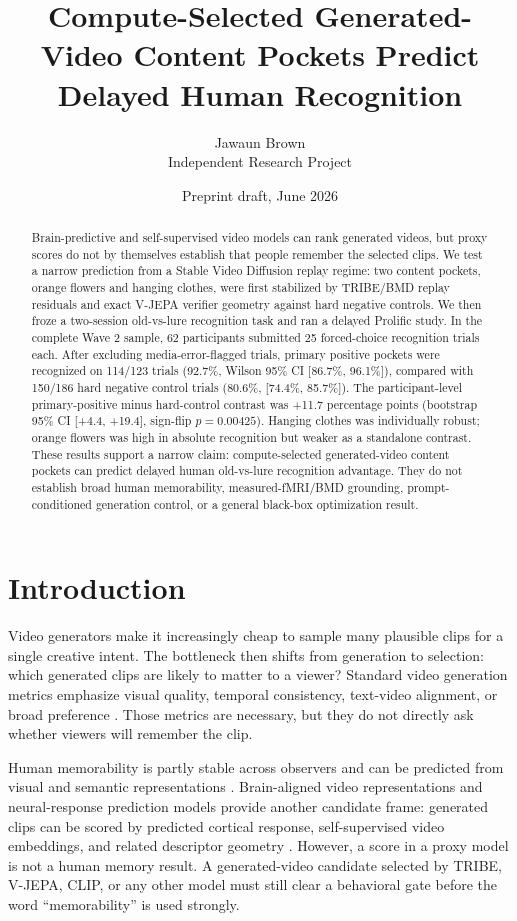 \documentclass[11pt]{article}
\title{Compute-Selected Generated-Video Content Pockets Predict Delayed Human Recognition}
\author{
  Jawaun Brown\\
  Independent Research Project
}
\date{Preprint draft, June 2026}
\begin{document}
\maketitle

\begin{abstract}
Brain-predictive and self-supervised video models can rank generated videos, but
proxy scores do not by themselves establish that people remember the selected
clips. We test a narrow prediction from a Stable Video Diffusion replay regime:
two content pockets, orange flowers and hanging clothes, were first stabilized
by TRIBE/BMD replay residuals and exact V-JEPA verifier geometry against hard
negative controls. We then froze a two-session old-vs-lure recognition task and
ran a delayed Prolific study. In the complete Wave 2 sample, 62 participants
submitted 25 forced-choice recognition trials each. After excluding
media-error-flagged trials, primary positive pockets were recognized on 114/123
trials (92.7\%, Wilson 95\% CI [86.7\%, 96.1\%]), compared with 150/186 hard
negative control trials (80.6\%, [74.4\%, 85.7\%]). The participant-level
primary-positive minus hard-control contrast was +11.7 percentage points
(bootstrap 95\% CI [+4.4, +19.4], sign-flip $p=0.00425$). Hanging clothes was
individually robust; orange flowers was high in absolute recognition but weaker
as a standalone contrast. These results support a narrow claim: compute-selected
generated-video content pockets can predict delayed human old-vs-lure
recognition advantage. They do not establish broad human memorability,
measured-fMRI/BMD grounding, prompt-conditioned generation control, or a general
black-box optimization result.
\end{abstract}

\section{Introduction}

Video generators make it increasingly cheap to sample many plausible clips for a
single creative intent. The bottleneck then shifts from generation to selection:
which generated clips are likely to matter to a viewer? Standard video
generation metrics emphasize visual quality, temporal consistency, text-video
alignment, or broad preference \citep{huang2023vbench,liu2023fetv}. Those
metrics are necessary, but they do not directly ask whether viewers will
remember the clip.

Human memorability is partly stable across observers and can be predicted from
visual and semantic representations \citep{isola2011memorability,
cohendet2019videomem,newman2020memento}. Brain-aligned video representations
and neural-response prediction models provide another candidate frame:
generated clips can be scored by predicted cortical response, self-supervised
video embeddings, and related descriptor geometry \citep{lahner2024boldmoments,
tribev2,bardes2025vjepa2}. However, a score in a proxy model is not a human
memory result. A generated-video candidate selected by TRIBE, V-JEPA, CLIP, or
any other model must still clear a behavioral gate before the word
``memorability'' is used strongly.
\end{document}
